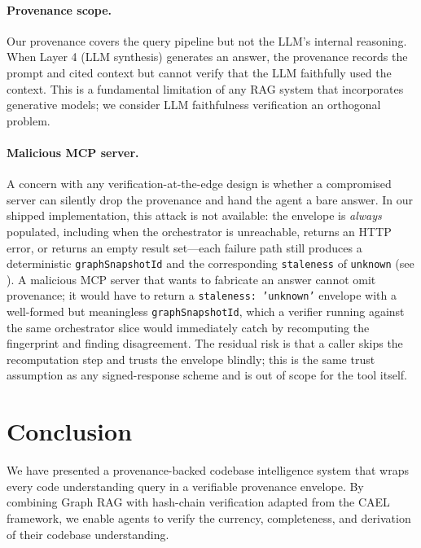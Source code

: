 \documentclass[conference]{IEEEtran}
\begin{document}
\paragraph{Provenance scope.} Our provenance covers the query pipeline
but not the LLM's internal reasoning. When Layer 4 (LLM synthesis)
generates an answer, the provenance records the prompt and cited
context but cannot verify that the LLM faithfully used the context. This
is a fundamental limitation of any RAG system that incorporates
generative models; we consider LLM faithfulness verification an
orthogonal problem.

\paragraph{Malicious MCP server.} A concern with any
verification-at-the-edge design is whether a compromised server can
silently drop the provenance and hand the agent a bare answer. In our
shipped implementation, this attack is not available: the envelope is
\emph{always} populated, including when the orchestrator is unreachable,
returns an HTTP error, or returns an empty result set---each failure
path still produces a deterministic \texttt{graphSnapshotId} and the
corresponding \texttt{staleness} of \texttt{unknown} (see
). A malicious MCP server that wants to
fabricate an answer cannot omit provenance; it would have to return a
\texttt{staleness: 'unknown'} envelope with a well-formed but
meaningless \texttt{graphSnapshotId}, which a verifier running against
the same orchestrator slice would immediately catch by recomputing the
fingerprint and finding disagreement. The residual risk is that a
caller skips the recomputation step and trusts the envelope blindly;
this is the same trust assumption as any signed-response scheme and is
out of scope for the tool itself.


\section{Conclusion}
\label{sec:conclusion}

We have presented a provenance-backed codebase intelligence system that
wraps every code understanding query in a verifiable provenance
envelope. By combining Graph RAG with hash-chain verification adapted
from the CAEL framework, we enable agents to verify the currency,
completeness, and derivation of their codebase understanding.
\end{document}
